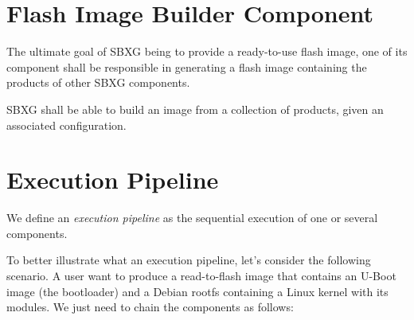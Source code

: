 \documentclass{article}
\begin{document}
\begin{center}
\end{center}

\section{Flash Image Builder Component}

The ultimate goal of SBXG being to provide a ready-to-use flash image, one of
its component shall be responsible in generating a flash image containing the
products of other SBXG components.

\begin{requirement}
  SBXG shall be able to build an image from a collection of products, given an
  associated configuration.
\end{requirement}

\begin{center}
\end{center}


\section{Execution Pipeline}

We define an \emph{execution pipeline} as the sequential execution of one or
several components.

To better illustrate what an execution pipeline, let's consider the following
scenario. A user want to produce a read-to-flash image that contains an U-Boot
image (the bootloader) and a Debian rootfs containing a Linux kernel with its
modules. We just need to chain the components as follows:
\end{document}
